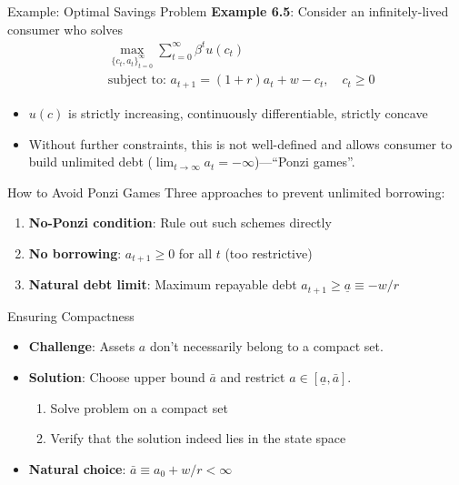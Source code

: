 \documentclass[9pt,aspectratio=169]{beamer}
\begin{document}
\begin{frame}{Example: Optimal Savings Problem}
    \textbf{Example 6.5}: Consider an infinitely-lived consumer who solves
    \begin{align*}
        &\max_{\{c_t,a_t\}_{t=0}^{\infty}} \sum_{t=0}^{\infty} \beta^t u(c_t) \\
        &\text{subject to: } a_{t+1} = (1+r)a_t + w - c_t, \quad c_t \geq 0
    \end{align*}
    \begin{itemize}
        \item $u(c)$ is strictly increasing, continuously differentiable,
        strictly concave
        \item Without further constraints, this is not well-defined and
        allows consumer to build unlimited debt ($\lim_{t \to \infty} a_t =
        -\infty$)---``Ponzi games''.
    \end{itemize}
\end{frame}

\begin{frame}{How to Avoid Ponzi Games}
Three approaches to prevent unlimited borrowing:
\begin{enumerate}
\item \textbf{No-Ponzi condition}: Rule out such schemes directly
\item \textbf{No borrowing}: $a_{t+1} \geq 0$ for all $t$ (too restrictive)
\item \textbf{Natural debt limit}: Maximum repayable debt $a_{t+1} \geq
\underline{a} \equiv -w/r$
\end{enumerate}
\end{frame}

\begin{frame}{Ensuring Compactness}
    \begin{itemize}
        \item \textbf{Challenge}: Assets $a$ don't necessarily belong to
        a compact set.
        \item \textbf{Solution}: Choose upper bound $\bar{a}$ and
        restrict $a \in [\underline{a}, \bar{a}]$.
        \begin{enumerate}
            \item Solve problem on a compact set
            \item Verify that the solution indeed lies in the state space
        \end{enumerate}
        \item \textbf{Natural choice}: $\bar{a} \equiv a_0 + w/r <
        \infty$
    \end{itemize}
\end{frame}
\end{document}
